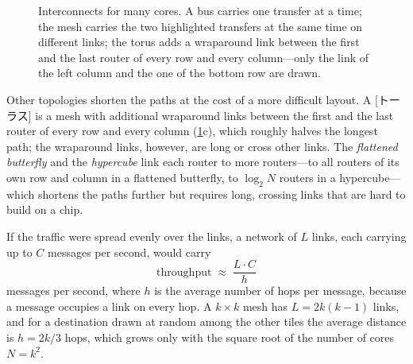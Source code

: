 \documentclass[../main.tex]{subfiles}
\begin{document}
\begin{figure}[htbp]
  \centering
  
  \caption{Interconnects for many cores.  A bus carries one transfer at a
    time; the mesh carries the two highlighted transfers at the same time on
    different links; the torus adds a wraparound link between the first and
    the last router of every row and every column---only the link of the
    left column and the one of the bottom row are drawn.}
  \label{fig:l22-topologies}
\end{figure}

Other topologies shorten the paths at the cost of a more difficult layout.
A [トーラス] is a mesh with additional wraparound links between
the first and the last router of every row and every column
(\cref{fig:l22-topologies}c), which roughly halves the longest path; the
wraparound links, however, are long or cross other links.  The
\emph{flattened butterfly} and the \emph{hypercube} link each router to more
routers---to all routers of its own row and column in a flattened butterfly,
to $\log_{2}N$ routers in a hypercube---which shortens the paths further but
requires long, crossing links that are hard to build on a chip.

If the traffic were spread evenly over the links, a network of $L$ links,
each carrying up to $C$ messages per second, would carry
\begin{equation}
  \text{throughput} \;\approx\; \frac{L\cdot C}{h}
  \label{eq:l22-throughput}
\end{equation}
messages per second, where $h$ is the average number of hops per message,
because a message occupies a link on every hop.  A $k\times k$ mesh has
$L=2k(k-1)$ links, and for a destination drawn at random among the other
tiles the average distance is $h=2k/3$ hops, which grows only with the
square root of the number of cores $N=k^{2}$.
\end{document}
